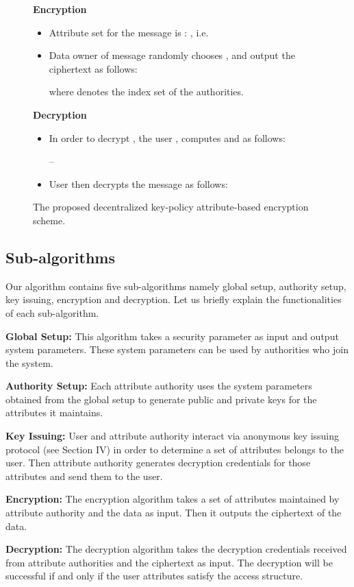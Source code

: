 \documentclass[10pt,journal]{IEEEtran}
\begin{document}
\begin{figure*}
{{\begin{itemize}
\end{itemize}


\textbf{Encryption} 
\begin{itemize}
\item Attribute set for the message  is : , i.e. 
\item Data owner of message  randomly chooses , and output the ciphertext as follows:

 where  denotes the index set of the authorities.
\end{itemize}


\textbf{Decryption} 
\begin{itemize}
  \item In order to decrypt , the user , computes  and  as follows:
\item[--]   
\item User then decrypts the message  as follows: 
\end{itemize}
}}
\caption{The proposed decentralized key-policy attribute-based encryption scheme.}
\label{main algorithm}
\end{figure*}  
\subsection{Sub-algorithms}
Our algorithm contains five sub-algorithms namely global setup, authority setup, key issuing, encryption and decryption. Let us briefly explain the functionalities of each sub-algorithm.

\noindent\textbf{Global Setup:} This algorithm takes a security parameter as input and output system parameters. These system parameters can be used by authorities who join the system.

\noindent\textbf{Authority Setup:} Each attribute authority uses the system parameters obtained from the global setup to generate public and private keys for the attributes it maintains.

\noindent\textbf{Key Issuing:}  User and  attribute authority interact via anonymous key issuing protocol (see Section IV) in order to determine a set of attributes belongs to the user. Then attribute authority  generates decryption credentials for  those attributes and send them to the user.

\noindent\textbf{Encryption:} The encryption algorithm takes a set of attributes maintained by attribute authority and the data as input. Then it outputs the ciphertext of the data.

\noindent\textbf{Decryption:} The decryption algorithm takes  the decryption credentials received from attribute authorities and the ciphertext as input. The decryption will be successful if and only if the user attributes satisfy the access structure.
\end{document}
